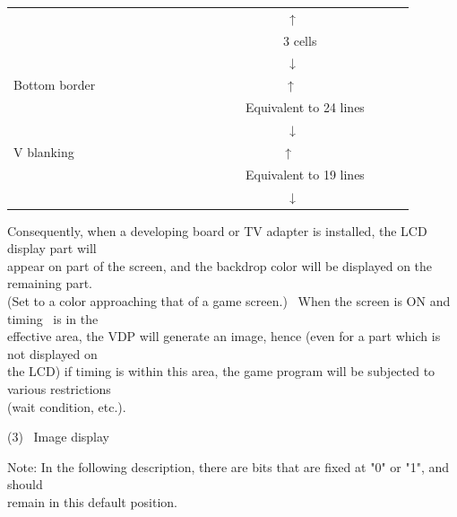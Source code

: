 \documentclass[a4paper,10pt]{article}
\begin{document}
\begin{tabular}{|l|l|l|cc|l}
\cline{2-2}
\multicolumn{3}{|l|}{\ \ \ \ \ \ \ \ \ \ \ \ \ \ \ \ \ \ \ \ \ \ \ \ \ \ \ \ \ \ \ \ \ \ \ \ \ \ \ \ \ \ \ \ ↑} & & &\\[-1.2em]
\multicolumn{3}{|l|}{\ \ \ \ \ \ \ \ \ \ \ \ \ \ \ \ \ \ \ \ \ \ \ \ \ \ \ \ \ \ \ \ \ \ \ \ \ \ \ \ \ \ \ 3 cells} & & &\\[-1.2em]
\multicolumn{3}{|l|}{\ \ \ \ \ \ \ \ \ \ \ \ \ \ \ \ \ \ \ \ \ \ \ \ \ \ \ \ \ \ \ \ \ \ \ \ \ \ \ \ \ \ \ \ ↓} & & &\\
\cline{1-3}
\multicolumn{3}{|l|}{Bottom border \ \ \ \ \ \ \ \ \ \ \ \ \ \ \ \ \ \ \ \ \ \ \ \ \ \ \ \ \ \ ↑} & & &\\[-1.2em]
\multicolumn{3}{|l|}{\ \ \ \ \ \ \ \ \ \ \ \ \ \ \ \ \ \ \ \ \ \ \ \ \ \ \ \ \ \ \ \ \ \ \ \ \ Equivalent to 24 lines} & & &\\[-1.2em]
\multicolumn{3}{|l|}{\ \ \ \ \ \ \ \ \ \ \ \ \ \ \ \ \ \ \ \ \ \ \ \ \ \ \ \ \ \ \ \ \ \ \ \ \ \ \ \ \ \ \ \ ↓} & & &\\
\cline{1-3}
\multicolumn{3}{|l|}{V blanking \ \ \ \ \ \ \ \ \ \ \ \ \ \ \ \ \ \ \ \ \ \ \ \ \ \ \ \ \ \ \ \ \ ↑} & & &\\[-1.2em]
\multicolumn{3}{|l|}{\ \ \ \ \ \ \ \ \ \ \ \ \ \ \ \ \ \ \ \ \ \ \ \ \ \ \ \ \ \ \ \ \ \ \ \ \ Equivalent to 19 lines} & & &\\[-1.2em]
\multicolumn{3}{|l|}{\ \ \ \ \ \ \ \ \ \ \ \ \ \ \ \ \ \ \ \ \ \ \ \ \ \ \ \ \ \ \ \ \ \ \ \ \ \ \ \ \ \ \ \ ↓} & & &\\
\cline{1-3}
\cline{5-5}
\end{tabular}

\vspace{3em}
Consequently, when a developing board or TV adapter is installed, the LCD display part will\\
appear on part of the screen, and the backdrop color will be displayed on the remaining part.\\
(Set to a color approaching that of a game screen.) \ When the screen is ON and timing \ is in the\\
effective area, the VDP will generate an image, hence (even for a part which is not displayed on\\
the LCD) if timing is within this area, the game program will be subjected to various restrictions\\
(wait condition, etc.).\\

{}

\noindent (3) \ Image display\par
Note: In the following description, there are bits that are fixed at "0" or "1", and should\\
remain in this default position.\\
\end{document}
